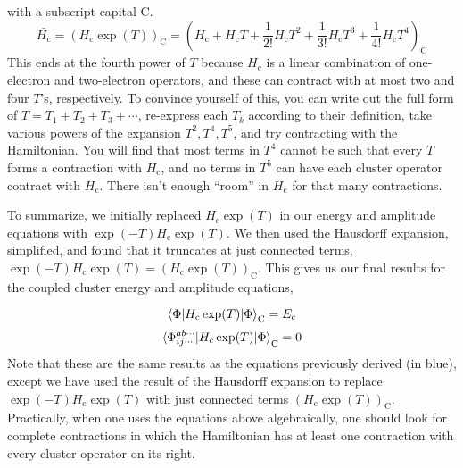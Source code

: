 \documentclass{article}
\newcommand{\Ec}{E_{\mathrm{c}}}
\newcommand{\Hc}{H_{\mathrm{c}}}
\begin{document}
with a subscript capital C.
\[\bar{\Hc} = (\Hc \exp(T))_{\mathrm{C}} = (\Hc + \Hc T + \frac{1}{2!} \Hc T^2 +
  \frac{1}{3!} \Hc T^3 +  \frac{1}{4!} \Hc T^4)_{\mathrm{C}} \]
This ends at the fourth power of $T$ because $\Hc$ is a linear combination of
one-electron and two-electron operators, and these can contract with
at most two and four $T$'s, respectively. 
To convince yourself of this, you can write out the full form 
of $T = T_1 + T_2 + T_3 + \cdots $, re-express each $T_k$ according to their
definition, take various powers of the expansion $T^2, T^4, T^5$, 
and try contracting with the Hamiltonian. 
You will find that most terms in $T^4$ cannot be such that every $T$ forms a contraction
with $\Hc$, and no terms in $T^5$ can have each cluster operator contract with $\Hc$.
There isn't enough ``room'' in $\Hc$ for that many contractions.

To summarize, we initially replaced $\Hc \exp(T)$ in our energy and amplitude equations
with $ \exp(-T) \Hc \exp(T)$. We then used the Hausdorff expansion, simplified,
and found that it truncates at just connected terms, $\exp(-T) \Hc \exp(T) = (\Hc \exp(T))_{\mathrm{C}}$. This gives us our final results for the coupled cluster energy and amplitude equations, 

\[\braket{\Phi |\Hc \exp(T) | \Phi }_\mathrm{C} = \Ec \]
\[\braket{ \Phi_{i j \cdots }^{a b \cdots} |\Hc \exp(T) | \Phi}_\mathrm{C} 
   =  0  \]
Note that these are the same results as the equations previously derived (in blue),
except we have used the result of the Hausdorff expansion to replace 
 $\exp(-T) \Hc \exp(T)$ with just connected terms $(\Hc \exp(T))_{\mathrm{C}}$.
Practically, when one uses the equations above algebraically, 
one should look for complete contractions in which the Hamiltonian
has at least one contraction with every cluster operator on its right.
\end{document}
